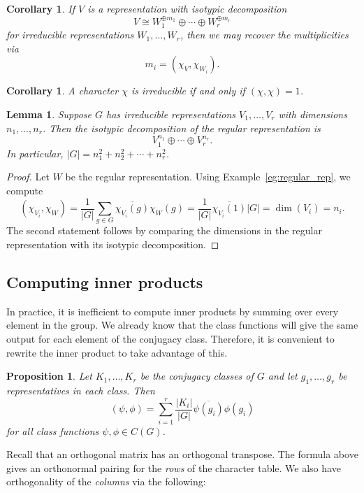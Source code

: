 \documentclass[12pt]{article}
\theoremstyle{plain}
\newtheorem{lemma}[theorem]{Lemma}
\newtheorem{proposition}[theorem]{Proposition}
\newtheorem{corollary}[theorem]{Corollary}
\theoremstyle{definition}
\theoremstyle{remark}
\numberwithin{equation}{section}
\begin{document}
\begin{corollary}
If $V$ is a representation with isotypic decomposition
\[
V \cong W_1^{\oplus m_1} \oplus \cdots \oplus W_r^{\oplus m_r}
\]
for irreducible representations $W_1, \ldots, W_r$,
then we may recover the multiplicities via
\[
m_i = \left( \chi_V, \chi_{W_i} \right).
\]
\end{corollary}

\begin{corollary}
A character $\chi$ is irreducible if and only if $(\chi,\chi)=1$.
\end{corollary}

\begin{lemma}
Suppose $G$ has irreducible representations $V_1,\ldots,V_r$
with dimensions $n_1,\ldots, n_r$.  Then the isotypic decomposition of
the regular representation is
\[
V_1^{n_1} \oplus \cdots \oplus V_r^{n_r} .
\]
In particular, $|G|=n_1^2 + n_2^2 + \cdots + n_r^2$.
\end{lemma}

\begin{proof}
Let $W$ be the regular representation.
Using Example~\ref{eg:regular_rep}, we compute
\[
( \chi_{V_i} , \chi_W ) = \frac{1}{|G|}
\sum_{g \in G} \overline{\chi_{V_i}(g)} \chi_W(g)
= \frac{1}{|G|} \overline{\chi_{V_i}(1)} |G|
= \dim(V_i)=n_i.
\]
The second statement follows by comparing the dimensions
in the regular representation with its isotypic decomposition.
\end{proof}

\subsection{Computing inner products}

In practice, it is inefficient to compute inner products by summing over
every element in the group.  We already know that the class functions
will give the same output for each element of the conjugacy class.
Therefore, it is convenient to rewrite the inner product to take
advantage of this.

\begin{proposition}
Let $K_1, \ldots, K_r$ be the conjugacy classes of $G$
and let $g_1,\ldots, g_r$ be representatives in each class.
Then
\[
( \psi, \phi ) = \sum_{i=1}^r \frac{|K_i|}{|G|}
\overline{\psi(g_i)}\phi(g_i)
\]
for all class functions $\psi,\phi \in C(G)$.
\end{proposition}

Recall that an orthogonal matrix has an orthogonal transpose.
The formula above gives an orthonormal pairing for the
\emph{rows} of the character table.  We also have orthogonality of the
\emph{columns} via the following:
\end{document}
